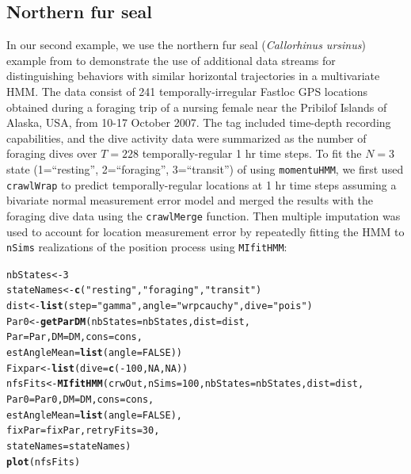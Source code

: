 \documentclass[12pt]{article}\usepackage[]{graphicx}\usepackage[]{color}
\makeatletter
\newcommand{\hlnum}[1]{\textcolor[rgb]{0.686,0.059,0.569}{#1}}%
\newcommand{\hlstr}[1]{\textcolor[rgb]{0.192,0.494,0.8}{#1}}%
\newcommand{\hlopt}[1]{\textcolor[rgb]{0,0,0}{#1}}%
\newcommand{\hlstd}[1]{\textcolor[rgb]{0.345,0.345,0.345}{#1}}%
\newcommand{\hlkwb}[1]{\textcolor[rgb]{0.69,0.353,0.396}{#1}}%
\newcommand{\hlkwc}[1]{\textcolor[rgb]{0.333,0.667,0.333}{#1}}%
\newcommand{\hlkwd}[1]{\textcolor[rgb]{0.737,0.353,0.396}{\textbf{#1}}}%
\newenvironment{kframe}{%
 \def\at@end@of@kframe{}%
 \ifinner\ifhmode%
  \def\at@end@of@kframe{\end{minipage}}%
  \begin{minipage}{\columnwidth}%
 \fi\fi%
 \def\FrameCommand##1{\hskip\@totalleftmargin \hskip-\fboxsep
 \colorbox{shadecolor}{##1}\hskip-\fboxsep
     \hskip-\linewidth \hskip-\@totalleftmargin \hskip\columnwidth}%
 \MakeFramed {\advance\hsize-\width
   \@totalleftmargin\z@ \linewidth\hsize
   \@setminipage}}%
 {\par\unskip\endMakeFramed%
 \at@end@of@kframe}
\newenvironment{knitrout}{}{} %
\makeatother
\begin{document}
\subsection{Northern fur seal}
\label{sec:nfs}
In our second example, we use the northern fur seal ({\it Callorhinus ursinus}) example from \cite{McClintockEtAl2014b} to demonstrate the use of additional data streams for distinguishing behaviors with similar horizontal trajectories in a multivariate HMM. The data consist of 241 temporally-irregular Fastloc GPS locations obtained during a foraging trip of a nursing female near the Pribilof Islands of Alaska, USA, from 10-17 October 2007. The tag included time-depth recording capabilities, and the dive activity data were summarized as the number of foraging dives over $T=228$ temporally-regular 1 hr time steps. To fit the $N=3$ state (1=``resting'', 2=``foraging'', 3=``transit'') of \cite{McClintockEtAl2014b} using \verb|momentuHMM|, we first used \verb|crawlWrap| to predict temporally-regular locations at 1 hr time steps assuming a bivariate normal measurement error model and merged the results with the foraging dive data using the \verb|crawlMerge| function. Then multiple imputation was used to account for location measurement error by repeatedly fitting the HMM to \verb|nSims| realizations of the position process using \verb|MIfitHMM|:%
\begin{knitrout}
\color{fgcolor}\begin{kframe}
\begin{alltt}
\hlstd{nbStates} \hlkwb{<-} \hlnum{3}
\hlstd{stateNames} \hlkwb{<-} \hlkwd{c}\hlstd{(}\hlstr{"resting"}\hlstd{,} \hlstr{"foraging"}\hlstd{,} \hlstr{"transit"}\hlstd{)}
\hlstd{dist} \hlkwb{<-} \hlkwd{list}\hlstd{(}\hlkwc{step} \hlstd{=} \hlstr{"gamma"}\hlstd{,} \hlkwc{angle} \hlstd{=} \hlstr{"wrpcauchy"}\hlstd{,} \hlkwc{dive} \hlstd{=} \hlstr{"pois"}\hlstd{)}
\hlstd{Par0} \hlkwb{<-} \hlkwd{getParDM}\hlstd{(}\hlkwc{nbStates} \hlstd{= nbStates,} \hlkwc{dist} \hlstd{= dist,}
                 \hlkwc{Par} \hlstd{= Par,} \hlkwc{DM} \hlstd{= DM,} \hlkwc{cons} \hlstd{= cons,}
                 \hlkwc{estAngleMean} \hlstd{=} \hlkwd{list}\hlstd{(}\hlkwc{angle} \hlstd{=} \hlnum{FALSE}\hlstd{))}
\hlstd{Fixpar} \hlkwb{<-} \hlkwd{list}\hlstd{(}\hlkwc{dive} \hlstd{=} \hlkwd{c}\hlstd{(}\hlopt{-}\hlnum{100}\hlstd{,} \hlnum{NA}\hlstd{,} \hlnum{NA}\hlstd{))}
\hlstd{nfsFits} \hlkwb{<-} \hlkwd{MIfitHMM}\hlstd{(crwOut,} \hlkwc{nSims} \hlstd{=} \hlnum{100}\hlstd{,} \hlkwc{nbStates} \hlstd{= nbStates,} \hlkwc{dist} \hlstd{= dist,}
                    \hlkwc{Par0} \hlstd{= Par0,} \hlkwc{DM} \hlstd{= DM,} \hlkwc{cons} \hlstd{= cons,}
                    \hlkwc{estAngleMean} \hlstd{=} \hlkwd{list}\hlstd{(}\hlkwc{angle} \hlstd{=} \hlnum{FALSE}\hlstd{),}
                    \hlkwc{fixPar} \hlstd{= fixPar,} \hlkwc{retryFits} \hlstd{=} \hlnum{30}\hlstd{,}
                    \hlkwc{stateNames}\hlstd{=stateNames)}
\hlkwd{plot}\hlstd{(nfsFits)}
\end{alltt}
\end{kframe}
\end{knitrout}
\end{document}
